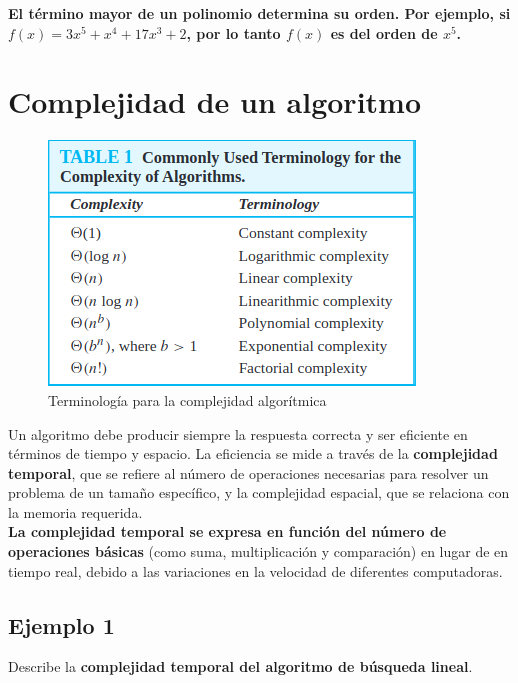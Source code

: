 \documentclass{article}
\begin{document}
\textbf{El término mayor de un polinomio determina su orden. Por ejemplo, si $f(x) = 3x^5+x^4+17x^3+2$, por lo tanto $f(x)$ es del orden de $x^5$.}

\newpage

\section{Complejidad de un algoritmo}

\begin{figure}
    \centering
    \includegraphics[width=\linewidth]{img-t1/img_951_53.png}
    \caption{Terminología para la complejidad algorítmica}
\end{figure}

Un algoritmo debe producir siempre la respuesta correcta y ser eficiente en términos de tiempo y espacio. La eficiencia se mide a través de la \textbf{complejidad temporal}, que se refiere al número de operaciones necesarias para resolver un problema de un tamaño específico, y la complejidad espacial, que se relaciona con la memoria requerida. \\

\textbf{La complejidad temporal se expresa en función del número de operaciones básicas} (como suma, multiplicación y comparación) en lugar de en tiempo real, debido a las variaciones en la velocidad de diferentes computadoras. 

\subsection{Ejemplo 1}

Describe la \textbf{complejidad temporal del algoritmo de búsqueda lineal}.
\end{document}
